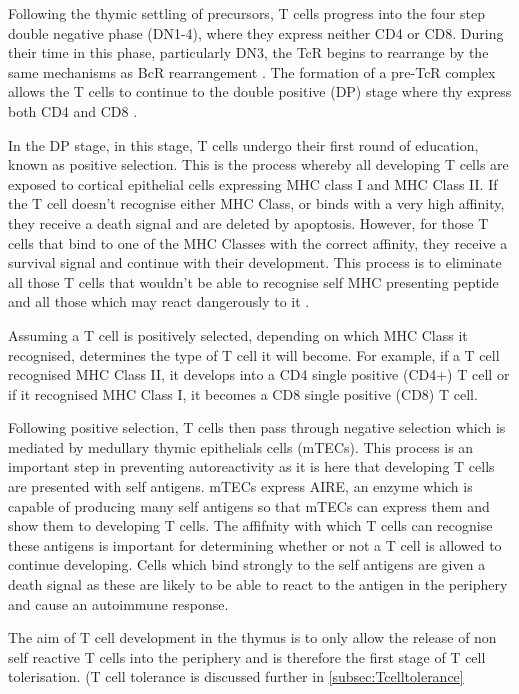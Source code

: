 Following the thymic settling of precursors, T cells progress into the four step double negative phase (DN1-4), where they express neither CD4 or CD8.
During their time in this phase, particularly DN3, the TcR begins to rearrange by the same mechanisms as BcR rearrangement \citep{Starr2003}.
The formation of a pre-TcR complex allows the T cells to continue to the double positive (DP) stage where thy express both CD4 and CD8 \citep{Zuniga1996}.

In the DP stage, in this stage, T cells undergo their first round of education, known as positive selection.
This is the process whereby all developing T cells are exposed to cortical epithelial cells expressing MHC class I and MHC Class II.
If the T cell doesn't recognise either MHC Class, or binds with a very high affinity, they receive a death signal and are deleted by apoptosis.
However, for those T cells that bind to one of the MHC Classes with the correct affinity, they receive a survival signal and continue with their development.
This process is to eliminate all those T cells that wouldn't be able to recognise self MHC presenting peptide and all those which  may react dangerously to it .

Assuming a T cell is positively selected, depending on which MHC Class it recognised, determines the type of T cell it will become.
For example, if a T cell recognised MHC Class II, it develops into a CD4 single positive (CD4+) T cell or if it recognised MHC Class I, it becomes a CD8 single positive (CD8) T cell.

Following positive selection, T cells then pass through negative selection which is mediated by medullary thymic epithelials cells (mTECs).
This process is an important step in preventing autoreactivity as it is here that developing T cells are presented with self antigens.
mTECs express AIRE, an enzyme which is capable of producing many self antigens so that mTECs can express them and show them to developing T cells.
The affifnity with which T cells can recognise these antigens is important for determining whether or not a T cell is allowed to continue developing.
Cells which bind strongly to the self antigens are given a death signal as these are likely to be able to react to the antigen in the periphery and cause an autoimmune response.

The aim of T cell development in the thymus is to only allow the release of non self reactive T cells into the periphery and is therefore the first stage of T cell tolerisation. 
(T cell tolerance is discussed further in \cref{subsec:Tcelltolerance}

